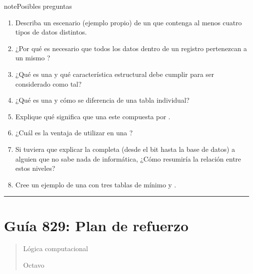 \documentclass[letterpaper,10pt,spanish]{sphinxmanual}
\begin{document}
\begin{sphinxadmonition}{note}{Posibles preguntas}
\begin{enumerate}
\item {} 
\sphinxAtStartPar
Describa un escenario (ejemplo propio) de un  que contenga al menos cuatro tipos de datos distintos.

\item {} 
\sphinxAtStartPar
¿Por qué es necesario que todos los datos dentro de un registro pertenezcan a un mismo ?

\item {} 
\sphinxAtStartPar
¿Qué es una  y qué característica estructural debe cumplir para ser considerado como tal?

\item {} 
\sphinxAtStartPar
¿Qué es una  y cómo se diferencia de una tabla individual?

\item {} 
\sphinxAtStartPar
Explique qué significa que una  este compuesta por .

\item {} 
\sphinxAtStartPar
¿Cuál es la ventaja de utilizar  en una ?

\item {} 
\sphinxAtStartPar
Si tuviera que explicar la  completa (desde el bit hasta la base de datos) a alguien que no sabe nada de informática, ¿Cómo resumiría la relación entre estos niveles?

\item {} 
\sphinxAtStartPar
Cree un ejemplo de una  con tres tablas de mínimo  y .

\end{enumerate}
\end{sphinxadmonition}


\bigskip\hrule\bigskip


\sphinxstepscope


\section{Guía 829: Plan de refuerzo}
\label{\detokenize{1_guias/8logica/G829:guia-829-plan-de-refuerzo}}\label{\detokenize{1_guias/8logica/G829::doc}}\begin{quote}\begin{description}
\sphinxAtStartPar
Lógica computacional

\sphinxAtStartPar
Octavo

\end{description}\end{quote}
\end{document}
